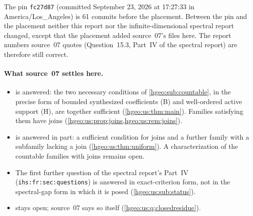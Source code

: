 \documentclass[11pt,letterpaper]{article}
\numberwithin{equation}{section}
\theoremstyle{definition}
\theoremstyle{remark}
\newcommand{\replabel}[1]{\nolinkurl{#1}}
\begin{document}
The pin \texttt{fc27d87} (committed September 23, 2026 at 17:27:33 in
America/Los\_Angeles) is 61 commits before the placement. Between the pin
and the placement neither this report nor the infinite-dimensional spectral
report changed, except that the placement added source~07's files here. The
report numbers source~07 quotes (Question~15.3, Part~IV of the spectral
report) are therefore still correct.

\paragraph{What source~07 settles here.}
\begin{itemize}[leftmargin=*]
\item {} is answered: the two necessary conditions of
\cref{hgeo:sub:countable}, in the precise form of bounded synthesized
coefficients (B) and well-ordered active support (H), are together
sufficient (\cref{hgeo:us:thm:main}). Families satisfying them have joins
(\cref{hgeo:us:prop:joins,hgeo:us:rem:joins}).
\item {} is answered in part: a sufficient condition
for joins and a further family with a subfamily lacking a join
(\cref{hgeo:us:thm:uniform}). A characterization of the countable families
with joins remains open.
\item The first further question of the spectral report's Part~IV
(\replabel{ihs:fr:sec:questions}) is answered in exact-criterion form, not in
the spectral-gap form in which it is posed (\cref{hgeo:us:sub:status}).
\item {} stays open; source~07 says so itself
(\cref{hgeo:us:q:closedresidue}).
\end{itemize}
\end{document}
